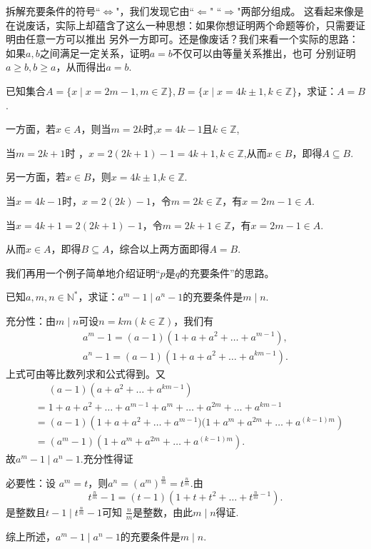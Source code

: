 拆解充要条件的符号``$\Leftrightarrow $"，我们发现它由``$\Leftarrow$" ``$\Rightarrow $"两部分组成。
这看起来像是在说废话，实际上却蕴含了这么一种思想：如果你想证明两个命题等价，只需要证明由任意一方可以推出
另外一方即可。还是像废话？我们来看一个实际的思路：如果$a,b$之间满足一定关系，证明$a=b$不仅可以由等量关系推出，也可
分别证明$a\geqslant b,b\geqslant a$，从而得出$a=b$.
\begin{example}
    已知集合$A=\{x \mid x=2m-1,m\in \mathbb{Z} \} ,B=\{x \mid x=4k\pm 1,k\in \mathbb{Z} \} $，求证：$A=B$.
\end{example}
\begin{prove}
    一方面，若$x\in A$，则当$m=2k$时,$x=4k-1$且$k\in \mathbb{Z}$,


    当$m=2k+1$时
    ，$x=2(2k+1)-1=4k+1,k\in \mathbb{Z}$,从而$x\in B$，即得$A\subseteq B$.


    另一方面，若$x∈B$，则$x=4k±1$,$k\in \mathbb{Z}$.


    当$x=4k-1$时，$x=2(2k)-1$，令$m=2k\in \mathbb{Z}$，有$x=2m-1\in A$.


    当$x=4k+1=2(2k+1)-1$，令$m=2k+1\in \mathbb{Z}$，有$x=2m-1\in A$.


    从而$x\in A$，即得$B\subseteq A$，综合以上两方面即得$A=B$.
\end{prove}


我们再用一个例子简单地介绍证明“$p$是$q$的充要条件”的思路。
\begin{example}
    已知$a,m,n\in \mathbb{N^*}$，求证：$a^m-1\mid a^n-1$的充要条件是$m\mid n$.
\end{example}
\begin{prove}
    充分性：由$m\mid n$可设$n=km(k\in \mathbb{Z})$，我们有
    \[
        \begin{aligned}
            a^m-1=(a-1)(1+a+a^2+\dots +a^{m-1}), \\
            a^n-1=(a-1)(1+a+a^2+\dots +a^{km-1}).
        \end{aligned}
    \]
    上式可由等比数列求和公式得到。又
    \[
        \begin{aligned}
             & \mathrel{\phantom{=}} (a-1)\left( a+a^2+\dots +a^{km-1} \right)               \\
             & =  1+a+a^2+\dots +a^{m-1}+a^m+\dots+a^{2m}+\dots+a^{km-1}                     \\
             & =  (a-1)\left( 1+a+a^2+\dots +a^{m-1})(1+a^m+a^{2m}+\dots +a^{(k-1)m} \right) \\
             & =  (a^m-1)\left( 1+a^m+a^{2m}+\dots +a^{(k-1)m} \right) .
        \end{aligned}
    \]
    故$a^m-1\mid a^n-1$.充分性得证


    必要性：设 $a^m=t$，则$a^n=(a^m)^{\frac{n}{m}}=t^{\frac{n}{m}}$.由
    \[
        t^{\frac{n}{m}}-1=(t-1)\left( 1+t+t^2+\dots +t^{\frac{n}{m}-1} \right)
        .\]
    是整数且$t-1\mid t^{\frac{n}{m}}-1$可知
    $\frac{n}{m}$是整数，由此$m\mid n$得证.


    综上所述，$a^m-1\mid a^n-1$的充要条件是$m\mid n$.

\end{prove}

